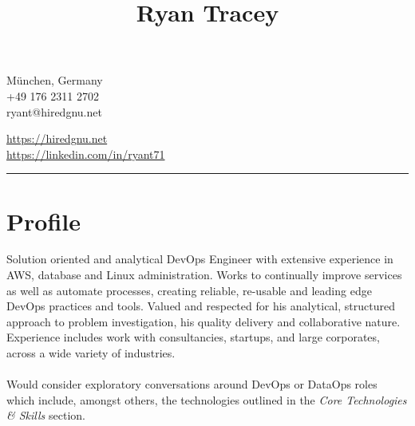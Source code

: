 \documentclass[10pt]{article}
\title{\bfseries\huge Ryan Tracey}
\author{}
\date{}
\begin{document}
\maketitle
\begin{minipage}[ht]{0.48\textwidth}
München, Germany\\
\Mobilefone\hspace{5pt}+49 176 2311 2702\\
\hspace{5pt}ryant@hiredgnu.net\\
\end{minipage}
\begin{minipage}[ht]{0.48\textwidth}
\hspace{5pt}\url{https://hiredgnu.net}\\
\hspace{5pt}\url{https://linkedin.com/in/ryant71}\\
\color{red}{\Bat}\hspace{2pt}\male
\end{minipage}
\vspace{20pt}
\hrule
\vspace{10pt}
\section*{Profile}
Solution oriented and analytical DevOps Engineer with extensive experience in AWS, database and Linux administration. Works to continually improve services as well as automate processes, creating reliable, re-usable and leading edge DevOps practices and tools.
Valued and respected for his analytical, structured approach to problem investigation, his quality delivery and collaborative nature.  Experience includes work with consultancies, startups, and large corporates, across a wide variety of industries.\\\\
Would consider exploratory conversations around DevOps or DataOps roles which include, amongst others, the technologies outlined in the \textit{Core Technologies  \& Skills} section.
\end{document}

